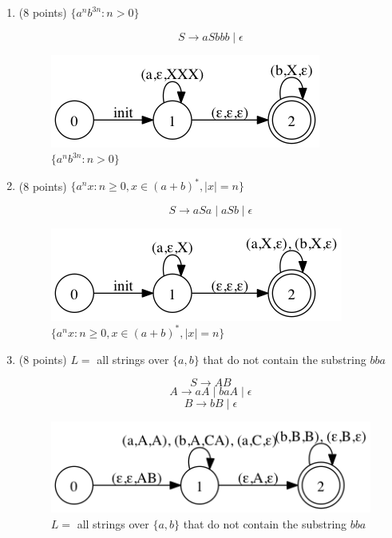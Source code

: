 \documentclass[paper=a4, fontsize=11pt]{scrartcl} %
\begin{document}
\begin{enumerate}
\item
  \begin{fancyquotes}
    (8 points) $\{a^nb^{3n} : n>0\}$
  \end{fancyquotes}

  $$S\rightarrow aSbbb \mid \epsilon$$

  \begin{figure}[H]
    \centering
    \includegraphics[scale=.7]{5-1.gv.png}
    \caption{$\{a^nb^{3n} : n>0\}$}
  \end{figure}

\item
  \begin{fancyquotes}
    (8 points) $\{a^nx : n\geq 0, x \in (a+b)^*, |x| = n \}$
  \end{fancyquotes}

  $$S\rightarrow aSa \mid aSb \mid \epsilon$$

  \begin{figure}[H]
    \centering
    \includegraphics[scale=.7]{5-1.gv.2.png}
    \caption{$\{a^nx : n\geq 0, x \in (a+b)^*, |x| = n \}$}
  \end{figure}

\item
  \begin{fancyquotes}
    (8 points) $L =$ all strings over $\{a,b\}$ that do not contain
    the substring $bba$
  \end{fancyquotes}

  $$S\rightarrow AB$$
  $$A\rightarrow aA \mid baA \mid \epsilon$$
  $$B\rightarrow bB \mid \epsilon$$

  \begin{figure}[H]
    \centering
    \includegraphics[scale=.7]{5-1.gv.3.png}
    \caption{$L =$ all strings over $\{a,b\}$ that do not contain the
      substring $bba$}
  \end{figure}


\end{enumerate}
\end{document}
